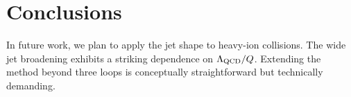 \section{Conclusions}\label{sec:conclusions}

In future work, we plan to apply the jet shape to heavy-ion collisions.
The wide jet broadening exhibits a striking dependence on $\Lambda_{\rm
QCD}/Q$. Extending the method beyond three loops is conceptually
straightforward but technically demanding.

